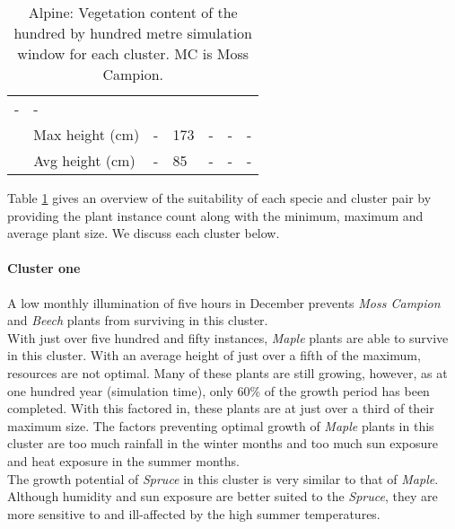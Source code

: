 \begin{table}[htb!]
\begin{tabular}{|p{2cm}|p{2cm}|p{1.5cm}|p{1.5cm}|p{1.5cm}|p{1.5cm}|p{1.5cm}|}
						\multicolumn{1}{l|}{-} & 
						\multicolumn{1}{l|}{-} \\\cline{2-7} &
						\multicolumn{1}{l|}{Max height (cm)} & 
						\multicolumn{1}{l|}{-} &
						\multicolumn{1}{l|}{173} & 
						\multicolumn{1}{l|}{-} &
						\multicolumn{1}{l|}{-} & 
						\multicolumn{1}{l|}{-} \\\cline{2-7} &
						\multicolumn{1}{l|}{Avg height (cm)} & 
						\multicolumn{1}{l|}{-} &
						\multicolumn{1}{l|}{85} & 
						\multicolumn{1}{l|}{-} &
						\multicolumn{1}{l|}{-} & 
						\multicolumn{1}{l|}{-} \\\cline{2-7}
		\hline                                                       
		\end{tabular}
	\caption{Alpine: Vegetation content of the hundred by hundred metre simulation window for each cluster. MC is Moss Campion.}
	\label{tab:results_alpine_species_cluster_properties}	
\end{table}

Table \ref{tab:results_alpine_species_cluster_properties} gives an overview of the suitability of each specie and cluster pair by providing the plant instance count along with the minimum, maximum and average plant size. We discuss each cluster below.\\

\paragraph{Cluster one}

A low monthly illumination of five hours in December prevents \textit{Moss Campion} and \textit{Beech} plants from surviving in this cluster.\\
With just over five hundred and fifty instances, \textit{Maple} plants are able to survive in this cluster. With an average height of just over a fifth of the maximum, resources are not optimal. Many of these plants are still growing, however, as at one hundred year (simulation time), only 60\% of the growth period has been completed. With this factored in, these plants are at just over a third of their maximum size. The factors preventing optimal growth of \textit{Maple} plants in this cluster are too much rainfall in the winter months and too much sun exposure and heat exposure in the summer months.\\
The growth potential of \textit{Spruce} in this cluster is very similar to that of \textit{Maple}. Although humidity and sun exposure are better suited to the \textit{Spruce}, they are more sensitive to and ill-affected by the high summer temperatures.

